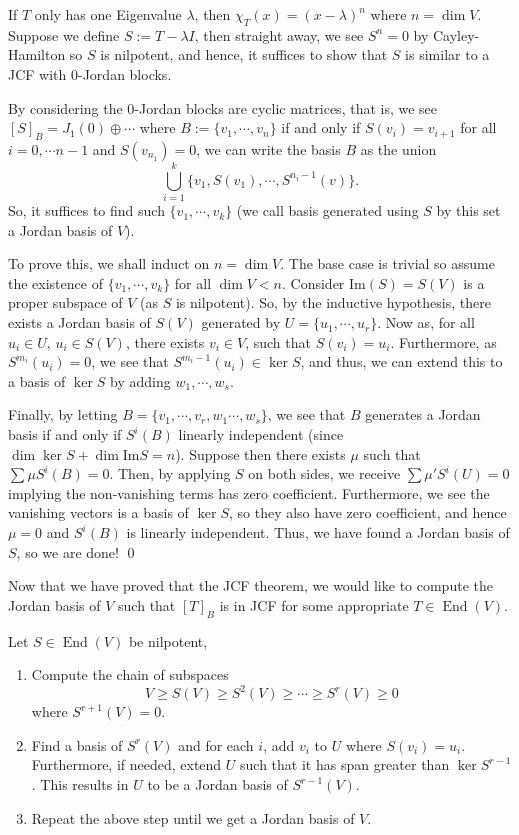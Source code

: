 \documentclass[
]{article}
\theoremstyle{definition}
\begin{document}
If \(T\) only has one Eigenvalue \(\lambda\), then
\(\chi_T(x) = (x - \lambda)^n\) where \(n = \dim V\). Suppose we define
\(S := T - \lambda I\), then straight away, we see \(S^n = 0\) by
Cayley-Hamilton so \(S\) is nilpotent, and hence, it suffices to show
that \(S\) is similar to a JCF with 0-Jordan blocks.

By considering the 0-Jordan blocks are cyclic matrices, that is, we see
\([S]_B = J_{1}(0) \oplus \cdots\) where \(B := \{v_1, \cdots, v_n\}\)
if and only if \(S(v_i) = v_{i + 1}\) for all \(i = 0, \cdots n - 1\)
and \(S(v_{n_1}) = 0\), we can write the basis \(B\) as the union
\[\bigcup_{i = 1}^k \{v_1, S(v_1), \cdots, S^{n_i - 1}(v)\}.\] So, it
suffices to find such \(\{v_1, \cdots, v_k\}\) (we call basis generated
using \(S\) by this set a Jordan basis of \(V\)).

To prove this, we shall induct on \(n = \dim V\). The base case is
trivial so assume the existence of \(\{v_1, \cdots, v_k\}\) for all
\(\dim V < n\). Consider \(\text{Im}(S) = S(V)\) is a proper subspace of
\(V\) (as \(S\) is nilpotent). So, by the inductive hypothesis, there
exists a Jordan basis of \(S(V)\) generated by
\(U = \{u_1, \cdots, u_r\}\). Now as, for all \(u_i \in U\),
\(u_i \in S(V)\), there exists \(v_i \in V\), such that
\(S(v_i) = u_i\). Furthermore, as \(S^{m_i}(u_i) = 0\), we see that
\(S^{m_i - 1}(u_i) \in \ker S\), and thus, we can extend this to a basis
of \(\ker S\) by adding \(w_1, \cdots, w_s\).

Finally, by letting \(B = \{v_1, \cdots, v_r, w_1 \cdots, w_s\}\), we
see that \(B\) generates a Jordan basis if and only if \(S^i(B)\)
linearly independent (since \(\dim \ker S + \dim \text{Im} S = n\)).
Suppose then there exists \(\mu\) such that \(\sum \mu S^i(B) = 0\).
Then, by applying \(S\) on both sides, we receive
\(\sum \mu'S^i(U) = 0\) implying the non-vanishing terms has zero
coefficient. Furthermore, we see the vanishing vectors is a basis of
\(\ker S\), so they also have zero coefficient, and hence \(\mu = 0\)
and \(S^i(B)\) is linearly independent. Thus, we have found a Jordan
basis of \(S\), so we are done! \qed

Now that we have proved that the JCF theorem, we would like to compute
the Jordan basis of \(V\) such that \([T]_B\) is in JCF for some
appropriate \(T \in \mathop{\mathrm{End}}(V)\).

Let \(S \in \mathop{\mathrm{End}}(V)\) be nilpotent,

\begin{enumerate}
  \item Compute the chain of subspaces
    \[V \ge S(V) \ge S^2(V) \ge \cdots \ge S^r(V) \ge 0\]
    where \(S^{r + 1}(V) = 0\).
  \item Find a basis of \(S^r(V)\) and for each \(i\), add \(v_i\) to \(U\) where 
    \(S(v_i) = u_i\). Furthermore, if needed, extend \(U\) such that it has span 
    greater than \(\ker S^{r - 1}\). This results in \(U\) to be a Jordan basis of \(S^{r - 1}(V)\).
  \item Repeat the above step until we get a Jordan basis of \(V\).
\end{enumerate}
\end{document}

